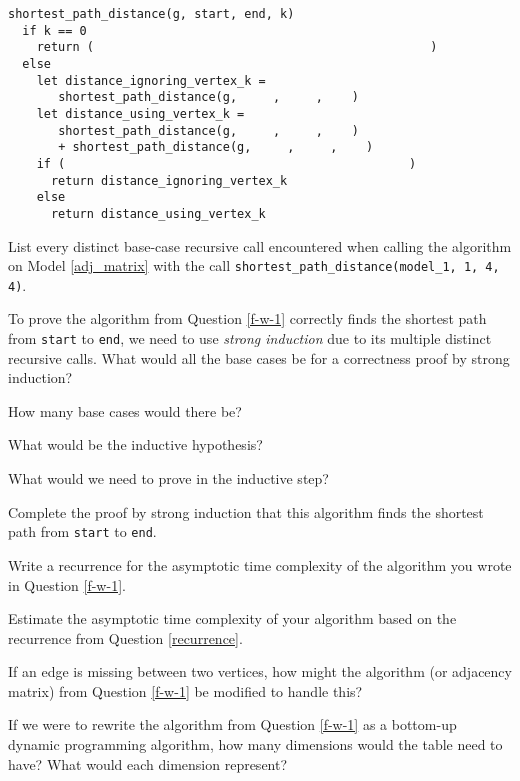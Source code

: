 \documentclass{tufte-handout}
\begin{document}
\begin{questions}
\begin{verbatim}
shortest_path_distance(g, start, end, k)
  if k == 0
    return (                                               )
  else 
    let distance_ignoring_vertex_k = 
       shortest_path_distance(g,     ,     ,    )
    let distance_using_vertex_k = 
       shortest_path_distance(g,     ,     ,    ) 
       + shortest_path_distance(g,     ,     ,    )
    if (                                                )
      return distance_ignoring_vertex_k
    else 
      return distance_using_vertex_k
\end{verbatim}

\item List every distinct base-case recursive call encountered when calling the algorithm on Model \ref{adj_matrix} with the call \verb|shortest_path_distance(model_1, 1, 4, 4)|.

\item To prove the algorithm from Question \ref{f-w-1} correctly finds the shortest path from \verb|start| to \verb|end|, we need to use \emph{strong induction} due to its multiple distinct recursive calls.  What would all the base cases be for a correctness proof by strong induction?

\item How many base cases would there be?

\item What would be the inductive hypothesis?

\item What would we need to prove in the inductive step?

\item Complete the proof by strong induction that this algorithm finds the shortest path from \verb|start| to \verb|end|.

\item Write a recurrence for the asymptotic time complexity of the algorithm you wrote in Question \ref{f-w-1}. \label{recurrence}

\item Estimate the asymptotic time complexity of your algorithm based on the recurrence from Question \ref{recurrence}.

\item If an edge is missing between two vertices, how might the algorithm (or adjacency matrix) from Question \ref{f-w-1} be modified to handle this?

\item If we were to rewrite the algorithm from Question \ref{f-w-1} as a bottom-up dynamic programming algorithm, how many dimensions would the table need to have? What would each dimension represent?


\end{questions}
\end{document}
